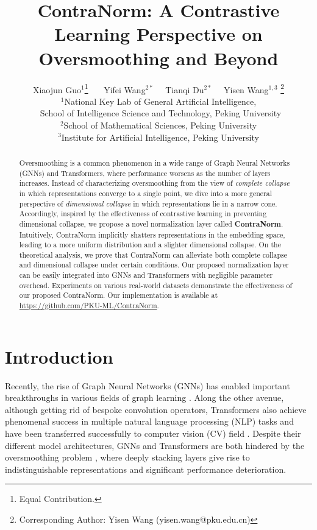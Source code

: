 \documentclass{article}
\title{ContraNorm: A Contrastive Learning Perspective on Oversmoothing and Beyond}
\author{Xiaojun Guo$^1$\thanks{Equal Contribution.}~~~ Yifei Wang$^{2*}$~~ Tianqi Du$^{2 *}$~~ Yisen Wang$^{1,3}$ \thanks{Corresponding Author: Yisen Wang (yisen.wang@pku.edu.cn)} \\
$^1$National Key Lab of General Artificial Intelligence,\\ \, School of Intelligence Science and Technology, Peking University\\
$^2$School of Mathematical Sciences, Peking University\\
$^3$Institute for Artificial Intelligence, Peking University
}
\theoremstyle{definition}
\theoremstyle{remark}
\theoremstyle{theorem}
\begin{document}
\maketitle


\begin{abstract}
Oversmoothing is a common phenomenon in a wide range of Graph Neural Networks (GNNs) and Transformers, where performance worsens as the number of layers increases. Instead of characterizing oversmoothing from the view of \textit{complete collapse} in which representations converge to a single point, we dive into a more general perspective of \textit{dimensional collapse} in which representations lie in a narrow cone. Accordingly, inspired by the effectiveness of contrastive learning in preventing dimensional collapse, we propose a novel normalization layer called \textbf{ContraNorm}. Intuitively, ContraNorm implicitly shatters representations in the embedding space, leading to a more uniform distribution and a slighter dimensional collapse. On the theoretical analysis, we prove that ContraNorm can alleviate both complete collapse and dimensional collapse under certain conditions. Our proposed normalization layer can be easily integrated into GNNs and Transformers with negligible parameter overhead. Experiments on various real-world datasets demonstrate the effectiveness of our proposed ContraNorm. Our implementation is available at \url{https://github.com/PKU-ML/ContraNorm}.
\end{abstract}

\section{Introduction}

Recently, the rise of Graph Neural Networks (GNNs) has enabled important breakthroughs in various fields of graph learning \citep{ying2018graph, senior2020improved}. Along the other avenue, although getting rid of bespoke convolution operators, Transformers \citep{vaswani2017attention} also achieve phenomenal success in multiple natural language processing (NLP) tasks \citep{lan2019albert, liu2019roberta, rajpurkar2018know} and have been transferred successfully to computer vision (CV) field \citep{dosovitskiy2020an, liu2021swin, strudel2021segmenter}. Despite their different model architectures, GNNs and Transformers are both hindered by the oversmoothing problem \citep{li2018deeper, tang2021augmented}, where deeply stacking layers give rise to indistinguishable representations and significant performance deterioration. 
\end{document}
